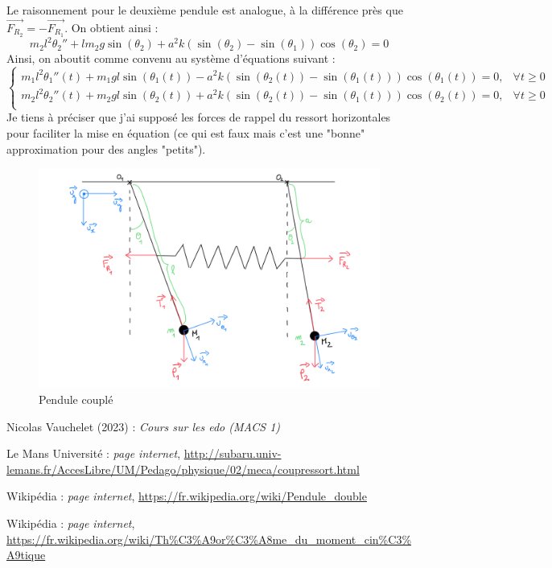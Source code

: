 \documentclass[9pt,a4paper]{article}
\begin{document}
Le raisonnement pour le deuxième pendule est analogue, à la différence près que $\vec{F_{R_2}} = -\vec{F_{R_1}}$. On obtient ainsi :
$$
m_2l^2\theta_2'' + lm_2g\sin(\theta_2) + a^2k(\sin(\theta_2) - \sin(\theta_1))\cos(\theta_2) = 0
$$
Ainsi, on aboutit comme convenu au système d'équations suivant :
$$
\left\{
\begin{array}{lcl}
    m_1l^2\theta_1''(t) + m_1gl\sin(\theta_1(t)) - a^2k(\sin(\theta_2(t)) - \sin(\theta_1(t)))\cos(\theta_1(t)) = 0, & \forall t \geq 0 \\
    m_2l^2\theta_2''(t) + m_2gl\sin(\theta_2(t)) + a^2k(\sin(\theta_2(t)) - \sin(\theta_1(t)))\cos(\theta_2(t)) = 0, & \forall t \geq 0 \\
\end{array}
\right.
$$
Je tiens à préciser que j'ai supposé les forces de rappel du ressort horizontales pour faciliter la mise en équation (ce qui est faux mais c'est une "bonne" approximation pour des angles "petits").
\begin{figure}
  \centering
  \includegraphics[scale=0.2]{schema_pendule_couple.png}
  \caption{Pendule couplé}
  \label{fig:pendule couplé}
\end{figure}

\newpage

\begin{thebibliography}{9}
Nicolas Vauchelet (2023) : \emph{Cours sur les \gls{edo} (MACS 1)}

Le Mans Université : \emph{page internet}, \url{http://subaru.univ-lemans.fr/AccesLibre/UM/Pedago/physique/02/meca/coupressort.html}

Wikipédia : \emph{page internet}, \url{https://fr.wikipedia.org/wiki/Pendule_double}

Wikipédia : \emph{page internet}, \url{https://fr.wikipedia.org/wiki/Th%C3%A9or%C3%A8me_du_moment_cin%C3%A9tique}
\end{thebibliography}
\end{document}
